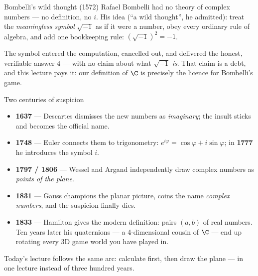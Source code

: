 \begin{frame}{Bombelli's wild thought (1572)}
Rafael Bombelli had no theory of complex numbers — no definition, no $i$.
His idea (``a wild thought'', he admitted): treat the \emph{meaningless
symbol} $\sqrt{-1}$ as if it were a number, obey every ordinary rule of
algebra, and add one bookkeeping rule: $(\sqrt{-1})^2 = -1$.

\pause

\begin{steps}
\end{steps}

\pause

\begin{remark}
The symbol entered the computation, cancelled out, and delivered the honest,
verifiable answer $4$ — with no claim about what $\sqrt{-1}$ \emph{is}.
That claim is a debt, and this lecture pays it: our definition of $\C$ is
precisely the licence for Bombelli's game.
\end{remark}
\end{frame}

\begin{frame}{Two centuries of suspicion}
\begin{itemize}
\item \textbf{1637} — Descartes dismisses the new numbers as \emph{imaginary};
the insult sticks and becomes the official name.
\pause
\item \textbf{1748} — Euler connects them to trigonometry:
$e^{i\varphi} = \cos\varphi + i\sin\varphi$; in \textbf{1777} he introduces the
symbol $i$.
\pause
\item \textbf{1797 / 1806} — Wessel and Argand independently draw complex
numbers as \emph{points of the plane}.
\pause
\item \textbf{1831} — Gauss champions the planar picture, coins the name
\emph{complex numbers}, and the suspicion finally dies.
\pause
\item \textbf{1833} — Hamilton gives the modern definition: pairs $(a,b)$ of
real numbers. Ten years later his quaternions — a 4-dimensional cousin of
$\C$ — end up rotating every 3D game world you have played in.
\end{itemize}
\pause
Today's lecture follows the same arc: calculate first, then draw the plane —
in one lecture instead of three hundred years.
\end{frame}

